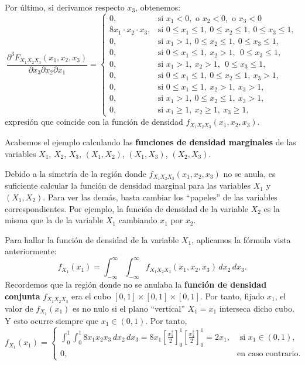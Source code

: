 \documentclass[
  letterpaper,
  DIV=11,
  numbers=noendperiod]{scrreprt}
\begin{document}
Por último, si derivamos respecto \(x_3\), obtenemos: \[
\frac{\partial^3 F_{X_1X_2X_3}(x_1,x_2,x_3)}{\partial x_3\partial x_2\partial x_1}=\begin{cases}
0, & \mbox{si }x_1<0,\mbox{ o }x_2<0,\mbox{ o }x_3 <0\\
8 x_1\cdot x_2\cdot x_3, & \mbox{si }0\leq x_1\leq 1,\ 0\leq x_2\leq 1,\ 0\leq x_3\leq 1, \\
 0, & \mbox{si }x_1> 1,\ 0\leq x_2\leq  1,\ 0\leq x_3\leq  1, \\
 0, & \mbox{si }0\leq x_1\leq  1,\ x_2> 1,\ \ 0\leq x_3\leq  1, \\
 0, & \mbox{si }x_1> 1,\ x_2> 1,\ \ 0\leq x_3\leq  1, \\
 0, & \mbox{si }0\leq x_1\leq  1,\ 0\leq x_2\leq  1,\ x_3> 1,\\
 0, & \mbox{si }0\leq x_1\leq  1,\ x_2 >  1,\ x_3> 1,\\
 0, & \mbox{si }x_1>1,\ 0\leq x_2\leq  1,\ x_3> 1,\\
0, & \mbox{si }x_1\geq 1,\ x_2\geq 1,\ x_3\geq 1,
\end{cases}
\] expresión que coincide con la función de densidad
\(f_{X_1X_2X_3}(x_1,x_2,x_3)\).

Acabemos el ejemplo calculando las \textbf{funciones de densidad
marginales} de las variables \(X_1\), \(X_2\), \(X_3\), \((X_1,X_2)\),
\((X_1,X_3)\), \((X_2,X_3)\).

Debido a la simetría de la región donde \(f_{X_1X_2X_3}(x_1,x_2,x_3)\)
no se anula, es suficiente calcular la función de densidad marginal para
las variables \(X_1\) y \((X_1,X_2)\). Para ver las demás, basta cambiar
los ``papeles'' de las variables correspondientes. Por ejemplo, la
función de densidad de la variable \(X_2\) es la misma que la de la
variable \(X_1\) cambiando \(x_1\) por \(x_2\).

Para hallar la función de densidad de la variable \(X_1\), aplicamos la
fórmula vista anteriormente: \[
f_{X_1}(x_1)=\int_{-\infty}^\infty\int_{-\infty}^\infty  f_{X_1X_2X_3}(x_1,x_2,x_3)\, dx_2\, dx_3.
\] Recordemos que la región donde no se anulaba la \textbf{función de
densidad conjunta} \(f_{X_1X_2X_3}\) era el cubo
\([0,1]\times [0,1]\times [0,1]\). Por tanto, fijado \(x_1\), el valor
de \(f_{X_1}(x_1)\) es no nulo si el plano ``vertical'' \(X_1=x_1\)
interseca dicho cubo. Y esto ocurre siempre que \(x_1\in (0,1)\). Por
tanto, \[
f_{X_1}(x_1)=\begin{cases}
\int_{0}^1\int_0^1 8 x_1x_2 x_3  \, dx_2\, dx_3=8x_1\left[\frac{x_2^2}{2}\right]_0^1 \left[\frac{x_3^2}{2}\right]_0^1 =2 x_1, & \mbox{ si }x_1\in (0,1),\\
0, & \mbox{en caso contrario.}
\end{cases}
\]
\end{document}
